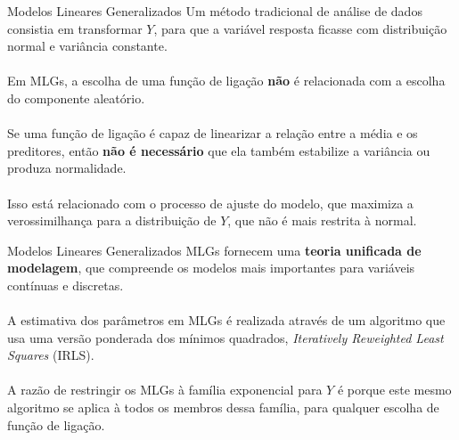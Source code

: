 \documentclass[10pt]{beamer}\usepackage[]{graphicx}\usepackage[]{color}
\theoremstyle{definition}
\begin{document}
\begin{frame}[fragile]{Modelos Lineares Generalizados}
  Um método tradicional de análise de dados consistia em transformar
  $Y$, para que a variável resposta ficasse com distribuição normal e
  variância constante. \\~\\
  Em MLGs, a escolha de uma função de ligação \textbf{não} é relacionada
  com a escolha do componente aleatório. \\~\\
  Se uma função de ligação é capaz de linearizar a relação entre a média
  e os preditores, então \textbf{não é necessário} que ela também
  estabilize a variância ou produza normalidade. \\~\\
  Isso está relacionado com o processo de ajuste do modelo, que maximiza
  a verossimilhança para a distribuição de $Y$, que não é mais restrita
  à normal.
\end{frame}

\begin{frame}[fragile]{Modelos Lineares Generalizados}
  MLGs fornecem uma \textbf{teoria unificada de modelagem}, que
  compreende os modelos mais importantes para variáveis contínuas e
  discretas. \\~\\
  A estimativa dos parâmetros em MLGs é realizada através de um
  algoritmo que usa uma versão ponderada dos mínimos quadrados,
  \textit{Iteratively Reweighted Least Squares} (IRLS). \\~\\
  A razão de restringir os MLGs à família exponencial para $Y$ é porque
  este mesmo algoritmo se aplica à todos os membros dessa família, para
  qualquer escolha de função de ligação.
\end{frame}
\end{document}
